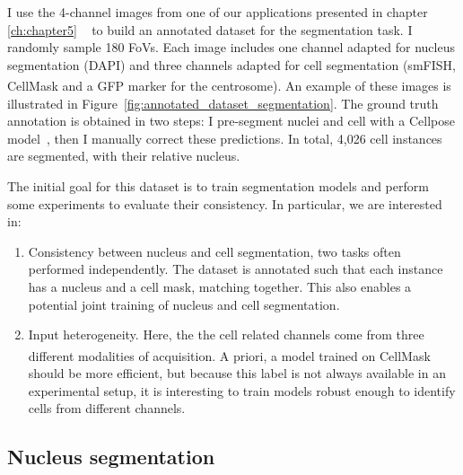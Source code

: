 I use the 4-channel images from one of our applications presented in chapter \ref{ch:chapter5} 
~\cite{safieddine_choreography_2021} to build an annotated dataset for the segmentation task.
I randomly sample 180 \ac{FoV}s.
Each image includes one channel adapted for nucleus segmentation (DAPI) and three channels adapted for cell segmentation (\ac{smFISH}, CellMask\textsuperscript{\texttrademark} and a \ac{GFP} marker for the centrosome).
An example of these images is illustrated in Figure~\ref{fig:annotated_dataset_segmentation}.
The ground truth annotation is obtained in two steps: I pre-segment nuclei and cell with a Cellpose model~\cite{stringer_cellpose_2021}, then I manually correct these predictions.
In total, 4,026 cell instances are segmented, with their relative nucleus.

The initial goal for this dataset is to train segmentation models and perform some experiments to evaluate their consistency.
In particular, we are interested in:
\begin{enumerate}
\item Consistency between nucleus and cell segmentation, two tasks often performed independently.
The dataset is annotated such that each instance has a nucleus and a cell mask, matching together.
This also enables a potential joint training of nucleus and cell segmentation.
\item Input heterogeneity. Here, the the cell related channels come from three different modalities of acquisition.
A priori, a model trained on CellMask\textsuperscript{\texttrademark} should be more efficient, but because this label is not always available in an experimental setup, it is interesting to train models robust enough to identify cells from different channels.
\end{enumerate}

\subsection{Nucleus segmentation}
\label{subsec:segmentation_nuc}

